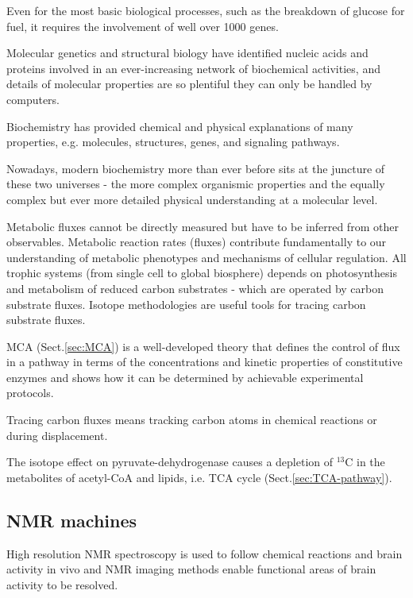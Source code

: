 \begin{mdframed}

Even for the most basic biological processes, such as the breakdown of glucose
for fuel, it requires the involvement of well over 1000 genes.

Molecular genetics and structural biology have identified nucleic acids and
proteins involved in an ever-increasing network of biochemical activities, and
details of molecular properties are so plentiful they can only be handled by
computers.

Biochemistry has provided chemical and physical explanations of many properties,
e.g. molecules, structures, genes, and signaling pathways.

Nowadays, modern biochemistry more than ever before sits at the juncture of
these two universes - the more complex organismic properties and the equally
complex but ever more detailed physical understanding at a molecular level.



\end{mdframed}


Metabolic fluxes cannot be directly measured but have to be inferred from other
observables. Metabolic reaction rates (fluxes) contribute fundamentally to our
understanding of metabolic phenotypes and mechanisms of cellular regulation.
All trophic systems (from single cell to global biosphere) depends on
photosynthesis and metabolism of reduced carbon substrates - which are operated
by carbon substrate fluxes. Isotope methodologies are useful tools for tracing
carbon substrate fluxes.

MCA (Sect.\ref{sec:MCA}) is a well-developed theory that defines the control of
flux in a pathway in terms of the concentrations and kinetic properties of
constitutive enzymes and shows how it can be determined by achievable
experimental protocols.


Tracing carbon fluxes means tracking carbon atoms in chemical reactions or
during displacement. 

The isotope effect on pyruvate-dehydrogenase causes a
depletion of $^{13}$C in the metabolites of acetyl-CoA and lipids, i.e. TCA
cycle (Sect.\ref{sec:TCA-pathway}).

\subsection{NMR machines}
\label{sec:NMR-machines}

High resolution NMR spectroscopy is used to follow chemical reactions and brain
activity in vivo and NMR imaging methods enable functional areas of brain
activity to be resolved.

